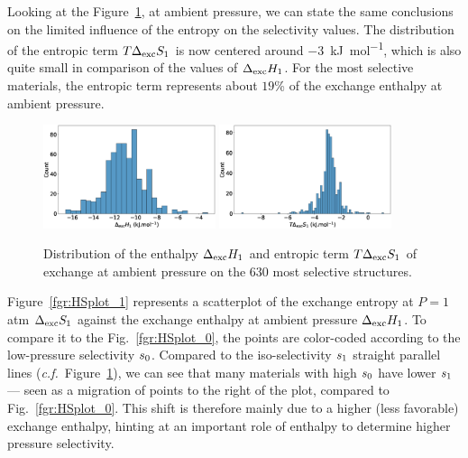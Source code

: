 \documentclass[main.tex]{subfiles}
\begin{document}
Looking at the Figure~\ref{fgr:SI:dist1}, at ambient pressure, we can state the same conclusions on the limited influence of the entropy on the selectivity values. The distribution of the entropic term $T\Delta_{\text{exc}}S_{\text{1}}$ is now centered around $-3$~\si{\kilo\joule\per\mole}, which is also quite small in comparison of the values of $\Delta_{\text{exc}}H_{\text{1}}$. For the most selective materials, the entropic term represents about {$19$\%} of the exchange enthalpy at ambient pressure.

\begin{figure}[h]
  \centering
    \includegraphics[width=0.45\textwidth]{figures/2-thermo/Delta_H_2080.jpg}
    \includegraphics[width=0.45\textwidth]{figures/2-thermo/T_Delta_S_2080.jpg}
    \caption{Distribution of the enthalpy $\Delta_{\text{exc}}H_{\text{1}}$ and entropic term $T\Delta_{\text{exc}}S_{\text{1}}$ of exchange at ambient pressure on the 630 most selective structures.}
    \label{fgr:SI:dist1}
\end{figure}

Figure~\ref{fgr:HSplot_1} represents a scatterplot of the exchange entropy at $P = 1$\,atm $\Delta_{\text{exc}}S_{\text{1}}$ against the exchange enthalpy at ambient pressure $\Delta_{\text{exc}}H_{\text{1}}$. To compare it to the Fig.~\ref{fgr:HSplot_0}, the points are color-coded according to the low-pressure selectivity $s_{\text{0}}$. Compared to the iso-selectivity $s_{\text{1}}$ straight parallel lines (\emph{c.f.}~Figure~\ref{fgr:SI:dist1}), we can see that many materials with high $s_{\text{0}}$ have lower $s_{\text{1}}$ --- seen as a migration of points to the right of the plot, compared to Fig.~\ref{fgr:HSplot_0}. This shift is therefore mainly due to a higher (less favorable) exchange enthalpy, hinting at an important role of enthalpy to determine higher pressure selectivity.
\end{document}

